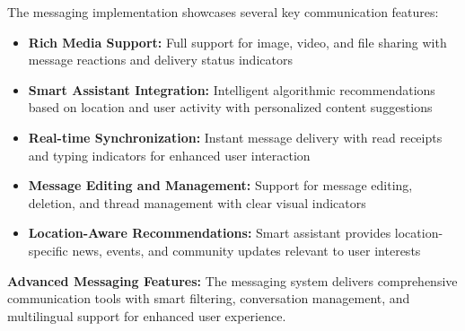 The messaging implementation showcases several key communication features:
\begin{itemize}
    \item \textbf{Rich Media Support:} Full support for image, video, and file sharing with message reactions and delivery status indicators
    \item \textbf{Smart Assistant Integration:} Intelligent algorithmic recommendations based on location and user activity with personalized content suggestions
    \item \textbf{Real-time Synchronization:} Instant message delivery with read receipts and typing indicators for enhanced user interaction
    \item \textbf{Message Editing and Management:} Support for message editing, deletion, and thread management with clear visual indicators
    \item \textbf{Location-Aware Recommendations:} Smart assistant provides location-specific news, events, and community updates relevant to user interests
\end{itemize}

\textbf{Advanced Messaging Features:}
The messaging system delivers comprehensive communication tools with smart filtering, conversation management, and multilingual support for enhanced user experience.

